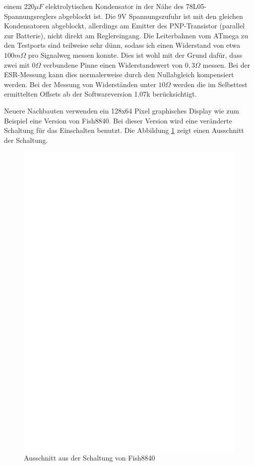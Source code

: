 einem \(220\mu F\) elektrolytischen Kondensator in der Nähe des 78L05-Spannungsreglers abgeblockt ist.
Die 9V Spannungszufuhr ist mit den gleichen Kondensatoren abgeblockt, allerdings am Emitter des PNP-Transistor
(parallel zur Batterie), nicht direkt am Reglereingang.
Die Leiterbahnen vom ATmega zu den Testports sind teilweise sehr dünn, sodass ich einen Widerstand
von etwa \(100m \Omega\) pro Signalweg messen konnte. Dies ist wohl mit der Grund dafür, dass zwei
mit \(0 \Omega\) verbundene Pinne einen Widerstandswert von \(0,3 \Omega\) messen.
Bei der ESR-Messung kann dies normalerweise durch den Nullabgleich kompensiert werden.
Bei der Messung von Widerständen unter \(10 \Omega\) werden die im Selbsttest ermittelten Offsets 
ab der Softwareversion 1.07k berücksichtigt.

Neuere Nachbauten verwenden ein 128x64 Pixel graphisches Display wie zum Beispiel eine Version von Fish8840.
Bei dieser Version wird eine veränderte Schaltung für das Einschalten benutzt. Die Abbildung \ref{fig:Fish8840}
zeigt einen Ausschnitt der Schaltung.

\begin{figure}[H]
\centering
\includegraphics[width=12cm]{../FIG/Fish8840.eps}
\caption{Ausschnitt aus der Schaltung von Fish8840}
\label{fig:Fish8840}
\end{figure}

